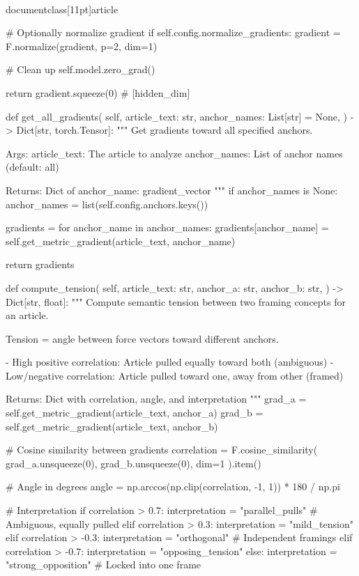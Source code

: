 \\documentclass[11pt]{article}
\begin{document}
\begin{CodeBlock}
        # Optionally normalize gradient
        if self.config.normalize_gradients:
            gradient = F.normalize(gradient, p=2, dim=1)

        # Clean up
        self.model.zero_grad()

        return gradient.squeeze(0)  # [hidden_dim]
    
    def get_all_gradients(
        self, 
        article_text: str,
        anchor_names: List[str] = None,
    ) -> Dict[str, torch.Tensor]:
        """
        Get gradients toward all specified anchors.
        
        Args:
            article_text: The article to analyze
            anchor_names: List of anchor names (default: all)
            
        Returns:
            Dict of {anchor_name: gradient_vector}
        """
        if anchor_names is None:
            anchor_names = list(self.config.anchors.keys())
        
        gradients = {}
        for anchor_name in anchor_names:
            gradients[anchor_name] = self.get_metric_gradient(article_text, anchor_name)
        
        return gradients
    
    def compute_tension(
        self,
        article_text: str,
        anchor_a: str,
        anchor_b: str,
    ) -> Dict[str, float]:
        """
        Compute semantic tension between two framing concepts for an article.
        
        Tension = angle between force vectors toward different anchors.
        
        - High positive correlation: Article pulled equally toward both (ambiguous)
        - Low/negative correlation: Article pulled toward one, away from other (framed)
        
        Returns:
            Dict with correlation, angle, and interpretation
        """
        grad_a = self.get_metric_gradient(article_text, anchor_a)
        grad_b = self.get_metric_gradient(article_text, anchor_b)
        
        # Cosine similarity between gradients
        correlation = F.cosine_similarity(
            grad_a.unsqueeze(0), 
            grad_b.unsqueeze(0), 
            dim=1
        ).item()
        
        # Angle in degrees
        angle = np.arccos(np.clip(correlation, -1, 1)) * 180 / np.pi
        
        # Interpretation
        if correlation > 0.7:
            interpretation = "parallel_pulls"  # Ambiguous, equally pulled
        elif correlation > 0.3:
            interpretation = "mild_tension"
        elif correlation > -0.3:
            interpretation = "orthogonal"  # Independent framings
        elif correlation > -0.7:
            interpretation = "opposing_tension"
        else:
            interpretation = "strong_opposition"  # Locked into one frame
        

\end{CodeBlock}
\end{document}
